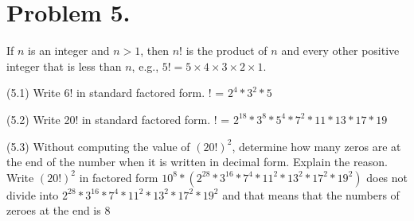 \documentclass[11pt]{article}
\begin{document}
\section*{Problem 5.}

If $n$ is an integer and $n>1$, then $n!$ is the product of $n$ and every other positive integer that is less than $n$, e.g., $5!=5\times 4\times 3\times 2\times 1$.
\newline

\noindent
(5.1) Write 6! in standard factored form.
\newline
{}! = $2^4 * 3^2 * 5$
\newline


\noindent
(5.2) Write 20! in standard factored form.
\newline
{}! = $2^{18} * 3^8 * 5^4 * 7^2 * 11 * 13 * 17 * 19$
\newline


\noindent
(5.3) Without computing the value of $(20!)^2$, determine how many zeros are at the end of the number when it is written in decimal form. Explain the reason.
\newline
\newline
Write $(20!)^2$ in factored form $10^{8} * (2^{28} * 3^{16} * 7^4 * 11^2 * 13^2 * 17^2 * 19^2)$
\newline
{} does not divide into $2^{28} * 3^{16} * 7^4 * 11^2 * 13^2 * 17^2 * 19^2$ and that means that the numbers of zeroes at the end is 8

\end{document}
